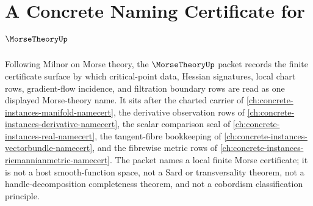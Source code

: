 \chapter{A Concrete Naming Certificate for $\MorseTheoryUp$}
\label{ch:concrete-instances-morse-theory-namecert}

Following Milnor on Morse theory, the $\MorseTheoryUp$ packet records the finite certificate surface by which critical-point data, Hessian signatures, local chart rows, gradient-flow incidence, and filtration boundary rows are read as one displayed Morse-theory name. It sits after the charted carrier of \autoref{ch:concrete-instances-manifold-namecert}, the derivative observation rows of \autoref{ch:concrete-instances-derivative-namecert}, the scalar comparison seal of \autoref{ch:concrete-instances-real-namecert}, the tangent-fibre bookkeeping of \autoref{ch:concrete-instances-vectorbundle-namecert}, and the fibrewise metric rows of \autoref{ch:concrete-instances-riemannianmetric-namecert}. The packet names a local finite Morse certificate; it is not a host smooth-function space, not a Sard or transversality theorem, not a handle-decomposition completeness theorem, and not a cobordism classification principle.

